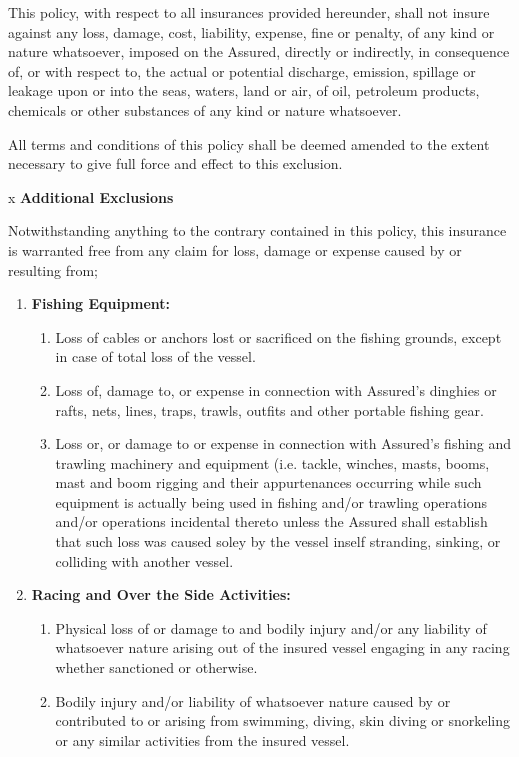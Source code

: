 \documentclass[10pt]{article}
\begin{document}
This policy, with respect to all insurances provided hereunder, shall not insure against any loss, damage, cost, liability, expense, fine or penalty, of any kind or nature whatsoever, imposed on the Assured, directly or indirectly, in consequence of, or with respect to, the actual or potential discharge, emission, spillage or leakage upon or into the seas, waters, land or air, of oil, petroleum products, chemicals or other substances of any kind or nature whatsoever.

All terms and conditions of this policy shall be deemed amended to the extent necessary to give full force and effect to this exclusion.

\vspace{\baselineskip}
x \hspace{0.25in} \textbf{Additional Exclusions}

Notwithstanding anything to the contrary contained in this policy, this insurance is warranted free from any claim for loss, damage or expense caused by or resulting from;

\begin{enumerate}[label*=\alph*]
    \item \textbf{Fishing Equipment:}
    \begin{enumerate}[label*=\arabic*]
        \item Loss of cables or anchors lost or sacrificed on the fishing grounds, except in case of total loss of the vessel.
        \item Loss of, damage to, or expense in connection with Assured’s dinghies or rafts, nets, lines, traps, trawls, outfits and other portable fishing gear.
        \item Loss or, or damage to or expense in connection with Assured’s fishing and trawling machinery and equipment (i.e. tackle, winches, masts, booms, mast and boom rigging and their appurtenances occurring while such equipment is actually being used in fishing and/or trawling operations and/or operations incidental thereto unless the Assured shall establish that such loss was caused soley by the vessel inself stranding, sinking, or colliding with another vessel.
    \end{enumerate}
    \item \textbf{Racing and Over the Side Activities:}
    \begin{enumerate}[label*=\arabic*]
        \item Physical loss of or damage to and bodily injury and/or any liability of whatsoever nature arising out of the insured vessel engaging in any racing whether sanctioned or otherwise.
        \item Bodily injury and/or liability of whatsoever nature caused by or contributed to or arising from swimming, diving, skin diving or snorkeling or any similar activities from the insured vessel.
    \end{enumerate}
\end{enumerate}
\end{document}
